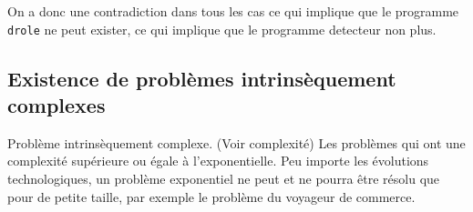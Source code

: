 On a donc une contradiction dans tous les cas ce qui implique que le programme \lstinline|drole| ne peut
exister, ce qui implique que le programme detecteur non plus.

\subsection{ Existence de problèmes intrinsèquement complexes}
	Problème intrinsèquement complexe. (Voir complexité) Les problèmes
		qui ont une complexité supérieure ou égale à l'exponentielle. Peu importe les évolutions technologiques, un problème exponentiel ne peut et ne pourra être résolu que pour de petite taille, par exemple le problème du voyageur de commerce. 



